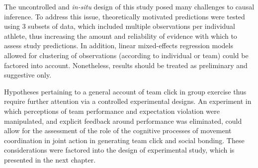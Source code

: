 \begin{CJK}{UTF8}{gbsn}
The uncontrolled and \textit{in-situ} design of this study posed many challenges to causal inference.  To address this issue, theoretically motivated predictions were tested using 3 subsets of data, which included multiple observations per individual athlete, thus increasing the amount and reliability of evidence with which to assess study predictions. In addition, linear mixed-effects regression models allowed for clustering of observations (according to individual or team) could be factored into account. Nonetheless, results should be treated as preliminary and suggestive only.

Hypotheses pertaining to a general account of team click in group exercise thus require further attention via a controlled experimental designs.  An experiment in which perceptions of team performance and expectation violation were manipulated, and explicit feedback around performance was eliminated, could allow for the assessment of the role of the cognitive processes of movement coordination in joint action in generating team click and social bonding.  These considerations were factored into the design of experimental study, which is presented in the next chapter.
                                                \end{CJK}
